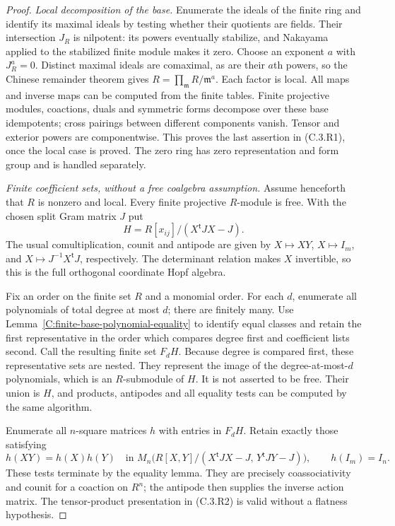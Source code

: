 \begin{proof}
\emph{Local decomposition of the base.}
Enumerate the ideals of the finite ring and identify its maximal
ideals by testing whether their quotients are fields. Their
intersection $J_R$ is nilpotent: its powers eventually stabilize,
and Nakayama applied to the stabilized finite module makes it zero.
Choose an exponent $a$ with $J_R^a=0$. Distinct maximal ideals are
comaximal, as are their $a$th powers, so the Chinese remainder theorem
gives
$R=\prod_{\mathfrak m}R/\mathfrak m^a$.
Each factor is local. All maps and inverse maps can be computed
from the finite tables. Finite projective modules, coactions, duals
and symmetric forms decompose over these base idempotents; cross
pairings between different components vanish. Tensor and exterior
powers are componentwise. This proves the last assertion in
(C.3.R1), once the local case is proved. The zero ring has zero
representation and form group and is handled separately.

\emph{Finite coefficient sets, without a free coalgebra assumption.}
Assume henceforth that $R$ is nonzero and local. Every finite
projective $R$-module is free. With the chosen split Gram matrix $J$ put
\[
 H=R[x_{ij}]/(X^{\mathsf t}JX-J).
\]
The usual comultiplication, counit and antipode are given by
$X\mapsto XY$, $X\mapsto I_m$, and
$X\mapsto J^{-1}X^{\mathsf t}J$, respectively. The determinant
relation makes $X$ invertible, so this is the full orthogonal
coordinate Hopf algebra.

Fix an order on the finite set $R$ and a monomial order. For each
$d$, enumerate all polynomials of total degree at most $d$; there
are finitely many. Use Lemma~\ref{C:finite-base-polynomial-equality}
to identify equal classes and retain the first representative in
the order which compares degree first and coefficient lists second.
Call the resulting finite set $F_dH$. Because degree is compared
first, these representative sets are nested. They represent the
image of the degree-at-most-$d$ polynomials, which is an $R$-submodule
of $H$. It is not asserted to be free. Their union is $H$, and
products, antipodes and all equality tests can be computed by the
same algorithm.

Enumerate all $n$-square matrices $h$ with entries in $F_dH$. Retain
exactly those satisfying
\[
 h(XY)=h(X)h(Y)
 \quad\text{in }M_n\bigl(R[X,Y]/(X^{\mathsf t}JX-J,\,
                                  Y^{\mathsf t}JY-J)\bigr),
 \qquad h(I_m)=I_n .                                    \tag{C.3.R2}
\]
These tests terminate by the equality lemma. They are precisely
coassociativity and counit for a coaction on $R^n$; the antipode
then supplies the inverse action matrix. The tensor-product
presentation in (C.3.R2) is valid without a flatness hypothesis.


\end{proof}
